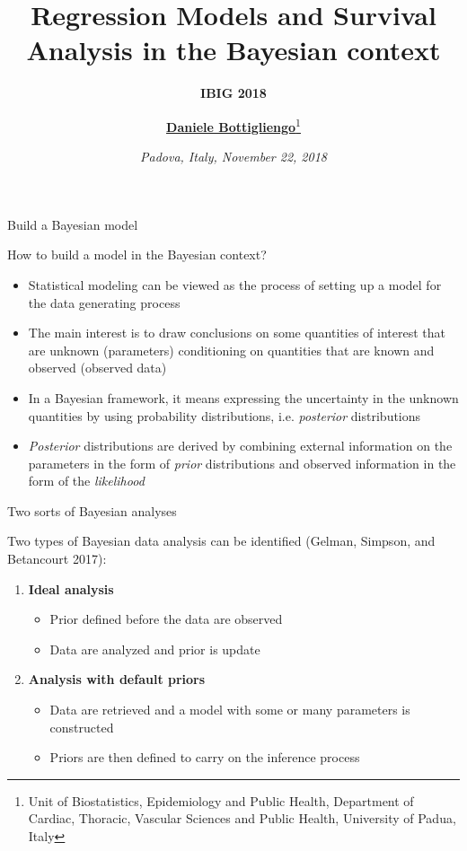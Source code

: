 \documentclass[ignorenonframetext,a4paper]{beamer}
\title{\Large\textbf{Regression Models and Survival Analysis in the Bayesian context}}
\subtitle{\large\textbf{\textrm{IBIG 2018}}}
\author{\centering\underline{\textbf{Daniele Bottigliengo}}\thanks{\tiny Unit of Biostatistics, Epidemiology and Public Health, Department of \newline Cardiac, Thoracic, Vascular Sciences and Public Health, University of Padua, Italy}}
\date{\centering\emph{Padova, Italy, November 22, 2018}}
\begin{document}
\frame{\titlepage}

\begin{frame}{Build a Bayesian model}

How to build a model in the Bayesian context?

\begin{itemize}
\item
  Statistical modeling can be viewed as the process of setting up a
  model for the data generating process
\item
  The main interest is to draw conclusions on some quantities of
  interest that are unknown (parameters) conditioning on quantities that
  are known and observed (observed data)
\item
  In a Bayesian framework, it means expressing the uncertainty in the
  unknown quantities by using probability distributions, i.e.
  \emph{posterior} distributions
\item
  \emph{Posterior} distributions are derived by combining external
  information on the parameters in the form of \emph{prior}
  distributions and observed information in the form of the
  \emph{likelihood}
\end{itemize}

\end{frame}

\begin{frame}{Two sorts of Bayesian analyses}

Two types of Bayesian data analysis can be identified (Gelman, Simpson,
and Betancourt 2017):

\begin{enumerate}
\setlength\itemsep{1em}
 \item{\textbf{Ideal analysis}}
    \begin{itemize}
    \item{Prior defined before the data are observed}
    \item{Data are analyzed and prior is update}
    \end{itemize}
 \item{\textbf{Analysis with default priors}}
    \begin{itemize}
    \item{Data are retrieved and a model with some or many parameters
          is constructed}
    \item{Priors are then defined to carry on the inference process}
    \end{itemize}
\end{enumerate}

\end{frame}
\end{document}
